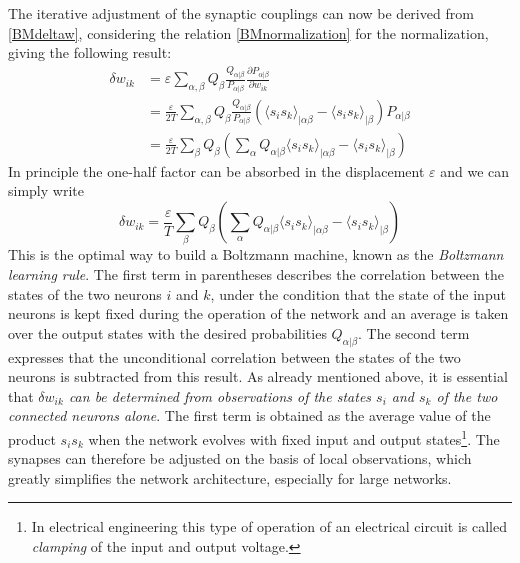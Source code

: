 The iterative adjustment of the synaptic couplings can now be derived from \eqref{BMdeltaw}, considering the relation \eqref{BMnormalization} for the normalization, giving the following result:
\begin{equation}
\begin{split}
\delta w_{ik}&=\varepsilon\sum_{\alpha,\beta}Q_\beta\frac{Q_{\alpha|\beta}}{P_{\alpha|\beta}}\frac{\partial P_{\alpha|\beta}}{\partial w_{ik}}\\
&=\frac{\varepsilon}{2T}\sum_{\alpha,\beta}Q_\beta\frac{Q_{\alpha|\beta}}{P_{\alpha|\beta}}\left({\langle s_is_k\rangle}_{|\alpha\beta}-{\langle s_is_k\rangle}_{|\beta}\right)P_{\alpha|\beta}\\
&=\frac{\varepsilon}{2T}\sum_\beta Q_\beta\left(\sum_\alpha Q_{\alpha|\beta}{\langle s_is_k\rangle}_{|\alpha\beta}-{\langle s_is_k\rangle}_{|\beta}\right)
\end{split}
\end{equation}
In principle the one-half factor can be absorbed in the displacement $\varepsilon$ and we can simply write
\begin{equation}\label{BMlearningrule}
\boxed{\delta w_{ik}=\frac{\varepsilon}{T}\sum_\beta Q_\beta\left(\sum_\alpha Q_{\alpha|\beta}{\langle s_is_k\rangle}_{|\alpha\beta}-{\langle s_is_k\rangle}_{|\beta}\right)}
\end{equation}
This is the optimal way to build a Boltzmann machine, known as the \emph{Boltzmann learning rule}. The first term in parentheses describes the correlation between the states of the two neurons $i$ and $k$, under the condition that the state of the input neurons is kept fixed during the operation of the network and an average is taken over the output states with the desired probabilities $Q_{\alpha|\beta}$. The second term expresses that the unconditional correlation between the states of the two neurons is subtracted from this result. As already mentioned above, it is essential that \emph{$\delta w_{ik}$ can be determined from observations of the states $s_i$ and $s_k$ of the two connected neurons alone}. The first term is obtained as the average value of the product $s_is_k$ when the network evolves with fixed input and output states\footnote{In electrical engineering this type of operation of an electrical circuit is called \emph{clamping} of the input and output voltage.}. The synapses can therefore be adjusted on the basis of local observations, which greatly simplifies the network architecture, especially for large networks.

